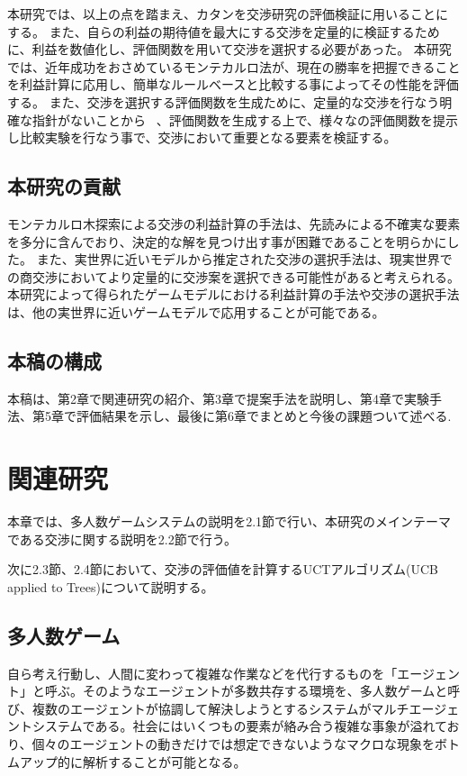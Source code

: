 \documentclass[a4, 10pt,dvipdfmx]{jsarticle}
\begin{document}
本研究では、以上の点を踏まえ、カタンを交渉研究の評価検証に用いることにする。
また、自らの利益の期待値を最大にする交渉を定量的に検証するために、利益を数値化し、評価関数を用いて交渉を選択する必要があった。
本研究では、近年成功をおさめているモンテカルロ法が、現在の勝率を把握できることを利益計算に応用し、簡単なルールベースと比較する事によってその性能を評価する。
また、交渉を選択する評価関数を生成ために、定量的な交渉を行なう明確な指針がないことから ~\cite{安村禎明2002モノポリーゲームにおける交渉エージェント}、評価関数を生成する上で、様々なの評価関数を提示し比較実験を行なう事で、交渉において重要となる要素を検証する。


\subsection{本研究の貢献}
モンテカルロ木探索による交渉の利益計算の手法は、先読みによる不確実な要素を多分に含んでおり、決定的な解を見つけ出す事が困難であることを明らかにした。
また、実世界に近いモデルから推定された交渉の選択手法は、現実世界での商交渉においてより定量的に交渉案を選択できる可能性があると考えられる。
本研究によって得られたゲームモデルにおける利益計算の手法や交渉の選択手法は、他の実世界に近いゲームモデルで応用することが可能である。


\subsection{本稿の構成}

本稿は、第2章で関連研究の紹介、第3章で提案手法を説明し、第4章で実験手法、第5章で評価結果を示し、最後に第6章でまとめと今後の課題ついて述べる.


\section{関連研究}

本章では、多人数ゲームシステムの説明を2.1節で行い、本研究のメインテーマである交渉に関する説明を2.2節で行う。

次に2.3節、2.4節において、交渉の評価値を計算するUCTアルゴリズム(UCB applied to Trees)について説明する。

\subsection{多人数ゲーム}
自ら考え行動し、人間に変わって複雑な作業などを代行するものを「エージェント」と呼ぶ。そのようなエージェントが多数共存する環境を、多人数ゲームと呼び、複数のエージェントが協調して解決しようとするシステムがマルチエージェントシステムである。社会にはいくつもの要素が絡み合う複雑な事象が溢れており、個々のエージェントの動きだけでは想定できないようなマクロな現象をボトムアップ的に解析することが可能となる。
\end{document}
